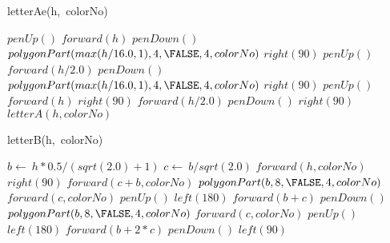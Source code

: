 \documentclass[a4paper,10pt]{article}
\begin{document}
\begin{algorithm}
\caption{letterAe(h,\ colorNo)}
\begin{algorithmic}[5]

\STATE {}
\STATE {}
  \STATE \(penUp()\)
  \STATE \(forward(h)\)
  \STATE \(penDown()\)
  \STATE {}
  \STATE {}
  \STATE \(polygonPart(max(h/16.0,1),4,\FALSE,4,colorNo)\)
  \STATE \(right(90)\)
  \STATE \(penUp()\)
  \STATE \(forward(h/2.0)\)
  \STATE \(penDown()\)
  \STATE {}
  \STATE {}
  \STATE \(polygonPart(max(h/16.0,1),4,\FALSE,4,colorNo)\)
  \STATE \(right(90)\)
  \STATE \(penUp()\)
  \STATE \(forward(h)\)
  \STATE \(right(90)\)
  \STATE \(forward(h/2.0)\)
  \STATE \(penDown()\)
  \STATE \(right(90)\)
  \STATE \(letterA(h,colorNo)\)

\end{algorithmic}
\end{algorithm}


\begin{algorithm}
\caption{letterB(h,\ colorNo)}
\begin{algorithmic}[5]

\STATE {}
\STATE {}
  \STATE \(b\gets\ h*0.5/(sqrt(2.0)+1)\)
  \STATE \(c\gets\ b/sqrt(2.0)\)
  \STATE \(forward(h,colorNo)\)
  \STATE \(right(90)\)
  \STATE \(forward(c+b,colorNo)\)
  \STATE \(polygonPart(b,8,\FALSE,4,colorNo)\)
  \STATE \(forward(c,colorNo)\)
  \STATE \(penUp()\)
  \STATE \(left(180)\)
  \STATE \(forward(b+c)\)
  \STATE \(penDown()\)
  \STATE \(polygonPart(b,8,\FALSE,4,colorNo)\)
  \STATE \(forward(c,colorNo)\)
  \STATE \(penUp()\)
  \STATE \(left(180)\)
  \STATE \(forward(b+2*c)\)
  \STATE \(penDown()\)
  \STATE \(left(90)\)

\end{algorithmic}
\end{algorithm}
\end{document}
